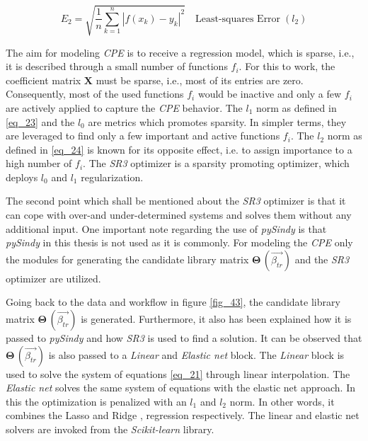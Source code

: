 \vspace{0.1cm}
\begin{equation}
    E_{2} =  \sqrt{\frac{1}{n} \sum_{k=1}^{n} |f(x_k) -y_k |^2 }  \quad \text{Least-squares Error} \;(l_{2})
    \label{eq_24}
\end{equation}
\vspace{0.1cm}

The aim for modeling \emph{CPE} is to receive a regression model, which is sparse, i.e., it is described through a small number of functions $f_i$.
For this to work, the coefficient matrix $\bm X$ must be sparse, i.e., most of its entries are zero. 
Consequently, most of the used functions $f_i$ would be inactive and only a few $f_i$ are actively applied to capture the \emph{CPE} behavior.
The $l_1$ norm as defined in \eqref{eq_23} and the $l_0$ are metrics which promotes sparsity.
In simpler terms, they are leveraged to find only a few important and active functions $f_i$. 
The $l_2$ norm as defined in \eqref{eq_24} is known for its opposite effect, i.e. to assign importance to a high number of $f_i$.
The \emph{SR3} optimizer is a sparsity promoting optimizer, which deploys $l_0$ and $l_1$ regularization.\newline

The second point which shall be mentioned about the \emph{SR3} optimizer is that it can cope with over-and under-determined systems and solves them without any additional input.
One important note regarding the use of \emph{pySindy} is that \emph{pySindy} in this thesis is not used as it is commonly. For modeling the \emph{CPE} only the modules for generating the candidate library matrix $\boldsymbol{\Theta}\,(\vec{\beta_{tr}})$ and the \emph{SR3} optimizer are utilized.\newline 

Going back to the data and workflow in figure \ref{fig_43}, the candidate library matrix $\boldsymbol{\Theta}\,(\vec{\beta_{tr}})$ is generated. 
Furthermore, it also has been explained how it is passed to \emph{pySindy} and how \emph{SR3} is used to find a solution. It can be observed that $\boldsymbol{\Theta}\,(\vec{\beta_{tr}})$ is also passed to a \emph{Linear} and \emph{Elastic net} block. The \emph{Linear} block is used to solve the system of equations \eqref{eq_21} through linear interpolation.
The \emph{Elastic net} solves the same system of equations with the elastic net approach. In this the optimization is penalized with an $l_1$ and $l_2$ norm.
In other words, it combines the Lasso \cite{Lasso, Brunton2019} and Ridge \cite{Brunton2019}, regression respectively. 
The linear and elastic net solvers are invoked from the \emph{Scikit-learn} \cite{scikit-learn} library.\newline 

